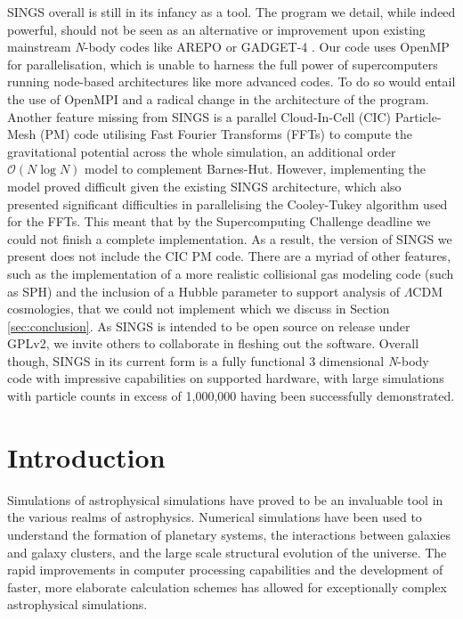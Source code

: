 \documentclass[12pt, twoside, letterpaper]{article}
\begin{document}
SINGS overall is still in its infancy as a tool. The program we detail, while indeed powerful, should not be seen as an alternative or improvement upon existing mainstream \textit{N}-body codes like AREPO \citep{springel2010pur} or GADGET-4 \citep{springel2021simulating}. Our code uses OpenMP for parallelisation, which is unable to harness the full power of supercomputers running node-based architectures like more advanced codes. To do so would entail the use of OpenMPI and a radical change in the architecture of the program. Another feature missing from SINGS is a parallel Cloud-In-Cell (CIC) Particle-Mesh (PM) code utilising Fast Fourier Transforms (FFTs) to compute the gravitational potential across the whole simulation, an additional order $\mathcal{O}(N\log N)$ model to complement Barnes-Hut. However, implementing the model proved difficult given the existing SINGS architecture, which also presented significant difficulties in parallelising the Cooley-Tukey algorithm used for the FFTs. This meant that by the Supercomputing Challenge deadline we could not finish a complete implementation. As a result, the version of SINGS we present does not include the CIC PM code. There are a myriad of other features, such as the implementation of a more realistic collisional gas modeling code (such as SPH) and the inclusion of a Hubble parameter to support analysis of $\Lambda$CDM cosmologies, that we could not implement which we discuss in Section \ref{sec:conclusion}. As SINGS is intended to be open source on release under GPLv2, we invite others to collaborate in fleshing out the software. Overall though, SINGS in its current form is a fully functional 3 dimensional \textit{N}-body code with impressive capabilities on supported hardware, with large simulations with particle counts in excess of 1,000,000 having been successfully demonstrated.
\pagebreak

\section{Introduction} \label{sec:intro}
Simulations of astrophysical simulations have proved to be an invaluable tool in the various realms of astrophysics. Numerical simulations have been used to understand the formation of planetary systems, the interactions between galaxies and galaxy clusters, and the large scale structural evolution of the universe. The rapid improvements in computer processing capabilities and the development of faster, more elaborate calculation schemes has allowed for exceptionally complex astrophysical simulations.
\end{document}
